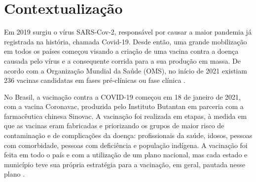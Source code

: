 
\label{Cap:Introducao}





\section{Contextualização}
\label{cap1:Sec:Contextualizacao}
Em 2019 surgiu o vírus SARS-Cov-2, responsável por causar a maior pandemia já registrada na história, chamada Covid-19. Desde então, uma grande mobilização em todos os países começou visando a criação de uma vacina contra a doença causada pelo vírus e a consequente corrida para a sua produção em massa. De acordo com a Organização Mundial da Saúde (OMS), no início de 2021 existiam 236 vacinas candidatas em fases pré-clínicas ou fase clínica \cite{ministerio2022plano}.


No Brasil, a vacinação contra a COVID-19 começou em 18 de janeiro de 2021, com a vacina Coronavac, produzida pelo Instituto Butantan em parceria com a farmacêutica chinesa Sinovac. A vacinação foi realizada em etapas, à medida em que as vacinas eram fabricadas e priorizando os grupos de maior risco de contaminação e de complicações da doença: profissionais da saúde, idosos, pessoas com comorbidade, pessoas com deficiência e população indígena. A vacinação foi feita em todo o país e com a utilização de um plano nacional, mas cada estado e município teve sua própria estratégia para a vacinação, em geral, pautada nesse plano \cite{ministerio2022plano}.


